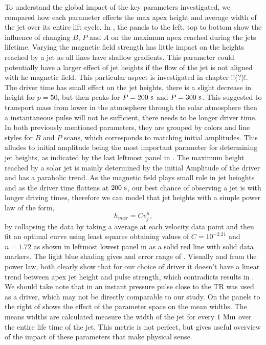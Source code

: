 To understand the global impact of the key parameters investigated, we compared how each parameter effects the max apex height and average width of the jet over its entire lift cycle. In , the panels to the left, top to bottom show the influence of changing $B$, $P$ and $A$ on the maximum apex reached during the jets lifetime. Varying the magnetic field strength has little impact on the heights reached by a jet as all lines have shallow gradients. This parameter could potentially have a larger effect of jet heights if the flow of the jet is not aligned with he magnetic field. This particular aspect is investigated in chapter !!(?)!.  The driver time has small effect on the jet heights, there is a slight decrease in height for $p=50$, but then peaks for $P=200~\rm{s}$ and $P=300~\rm{s}$. This suggested to transport mass from lower in the atmosphere through the solar atmosphere then a instantaneous pulse will not be sufficient, there needs to be longer driver time. In both previously mentioned parameters, they are grouped by colors and line styles for $B$ and $P$ scans, which corresponds to matching initial amplitudes. This alludes to initial amplitude being the most important parameter for determining jet heights, as indicated by the last leftmost panel in . The maximum height reached by a solar jet is mainly determined by the initial Amplitude of the driver and has a parabolic trend. As the magnetic field plays small role in jet heioghts and as the driver time flattens at $200~\rm{s}$, our best chance of observing a jet is with longer driving times, therefore we can model that jet heights with a simple power law of the form, 
\begin{equation}
h_{max} = C v_j^{n},
\end{equation} 
by collapsing the data by taking a average at each velocity data point and then fit an optimal curve using least squares obtaining values of $C= 10^{-2.21}$ and $n= 1.72$ as shown in leftmost lowest panel in  as a solid red line with solid data markers. The light blue shading gives and error range of . Visually and from the power law, both clearly show that for our choice of driver it doesn't have a linear trend between apex jet height and pulse strength, which contradicts results in \cite{Singh2019}. We should take note that in \cite{Singh2019} an instant pressure pulse close to the TR was used as a driver, which may not be directly comparable to our study. \np     
%
On the panels to the right of  shows the effect of the parameter space on the mean widths. The means widths are calculated measure the width of the jet for every $1~\rm{Mm}$ over the entire life time of the jet. This metric is not perfect, but gives useful overview of the impact of these parameters that make physical sense.     
